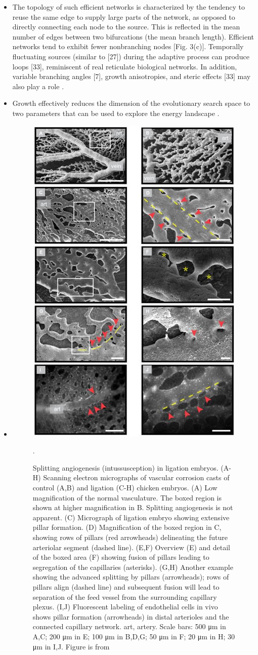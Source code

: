 \begin{itemize}
	\item The topology of such efficient networks is characterized by the tendency to reuse the same edge to supply large parts of the network, as opposed to directly connecting each node to the source. This is reflected in the mean number of edges between two bifurcations (the mean branch length). Efficient networks tend to exhibit fewer nonbranching nodes [Fig. 3(c)]. Temporally fluctuating sources (similar to [27]) during the adaptive process can produce loops [33], reminiscent of real reticulate biological networks. In addition, variable branching angles [7], growth anisotropies, and steric effects [33] may also play a role \cite{Ronellenfitsch2016}.
	\item Growth effectively reduces the dimension of the evolutionary search space to two parameters that can be used to explore the energy landscape \cite{Ronellenfitsch2016}.
	\item 
	\begin{figure}
		\centering
		\includegraphics[width=0.5\linewidth]{images/pillarFormationInEmbryoLigation}
		\caption{Splitting angiogenesis (intussusception) in ligation embryos. (A-H) Scanning electron micrographs of vascular corrosion casts of control (A,B) and ligation (C-H) chicken embryos. (A) Low magnification of the normal vasculature. The boxed region is shown at higher magnification in B. Splitting angiogenesis is not apparent. (C) Micrograph of ligation embryo showing extensive pillar formation. (D) Magnification of the boxed region in C, showing rows of pillars (red arrowheads) delineating the future arteriolar segment (dashed line). (E,F) Overview (E) and detail of the boxed area (F) showing fusion of pillars leading to segregation of the capillaries (asterisks). (G,H) Another example showing the advanced splitting by pillars (arrowheads); rows of pillars align (dashed line) and subsequent fusion will lead to separation of the feed vessel from the surrounding capillary plexus. (I,J) Fluorescent labeling of endothelial cells in vivo shows pillar formation (arrowheads) in distal arterioles and the connected capillary network. art, artery. Scale bars: 500 μm in A,C; 200 μm in E; 100 μm in B,D,G; 50 μm in F; 20 μm in H; 30 μm in I,J. Figure is from \cite{Buschmann2010}}.
	\end{figure}
	
\end{itemize}


